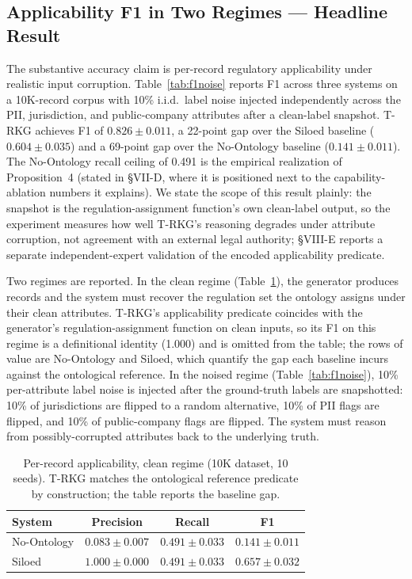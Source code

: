 \documentclass{ieeeaccess}
\begin{document}
\subsection{Applicability F1 in Two Regimes --- Headline Result}
\label{sec:f1}

The substantive accuracy claim is per-record regulatory applicability under realistic input corruption. Table~\ref{tab:f1noise} reports F1 across three systems on a 10K-record corpus with 10\% i.i.d.\ label noise injected independently across the PII, jurisdiction, and public-company attributes after a clean-label snapshot. T-RKG achieves F1 of $0.826 \pm 0.011$, a 22-point gap over the Siloed baseline ($0.604 \pm 0.035$) and a 69-point gap over the No-Ontology baseline ($0.141 \pm 0.011$). The No-Ontology recall ceiling of 0.491 is the empirical realization of Proposition~4 (stated in §VII-D, where it is positioned next to the capability-ablation numbers it explains). We state the scope of this result plainly: the snapshot is the regulation-assignment function's own clean-label output, so the experiment measures how well T-RKG's reasoning degrades under attribute corruption, not agreement with an external legal authority; §VIII-E reports a separate independent-expert validation of the encoded applicability predicate.

Two regimes are reported. In the clean regime (Table~\ref{tab:f1clean}), the generator produces records and the system must recover the regulation set the ontology assigns under their clean attributes. T-RKG's applicability predicate coincides with the generator's regulation-assignment function on clean inputs, so its F1 on this regime is a definitional identity (1.000) and is omitted from the table; the rows of value are No-Ontology and Siloed, which quantify the gap each baseline incurs against the ontological reference. In the noised regime (Table~\ref{tab:f1noise}), 10\% per-attribute label noise is injected after the ground-truth labels are snapshotted: 10\% of jurisdictions are flipped to a random alternative, 10\% of PII flags are flipped, and 10\% of public-company flags are flipped. The system must reason from possibly-corrupted attributes back to the underlying truth.

\begin{table}[t]
\centering
\caption{Per-record applicability, clean regime (10K dataset, 10 seeds). T-RKG matches the ontological reference predicate by construction; the table reports the baseline gap.}
\label{tab:f1clean}
\begin{tabular}{lccc}
\hline\hline
System & Precision & Recall & F1 \\
\hline
No-Ontology       & $0.083 \pm 0.007$ & $0.491 \pm 0.033$ & $0.141 \pm 0.011$ \\
Siloed            & $1.000 \pm 0.000$ & $0.491 \pm 0.033$ & $0.657 \pm 0.032$ \\
\hline\hline
\end{tabular}
\end{table}
\end{document}
